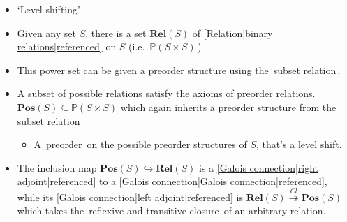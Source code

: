 

\begin{itemize}
    \item `Level shifting'
    \item Given any set $S$, there is a set $\mathbf{Rel}(S)$ of \ref{Relation|binary relations|referenced} on $S$ (i.e. \,$\mathbb{P}(S \times S)$\,)
    \item This power set can be given a preorder structure using the \,subset relation\,.
    \item A subset of possible relations satisfy the axioms of preorder relations. $\mathbf{Pos}(S) \subseteq \mathbb{P}(S \times S)$ which again inherits a preorder structure from the subset relation
          \begin{itemize}
            \item A \,preorder\, on the possible preorder structures of $S$, that's a level shift.
          \end{itemize}
    \item The inclusion map $\mathbf{Pos}(S) \hookrightarrow \mathbf{Rel}(S)$ is a \ref{Galois connection|right adjoint|referenced} to a \ref{Galois connection|Galois connection|referenced}, while its \ref{Galois connection|left adjoint|referenced} is $\mathbf{Rel}(S)\overset{Cl}{\twoheadrightarrow} \mathbf{Pos}(S)$ which takes the \,reflexive and transitive closure\, of an arbitrary relation.
  \end{itemize}